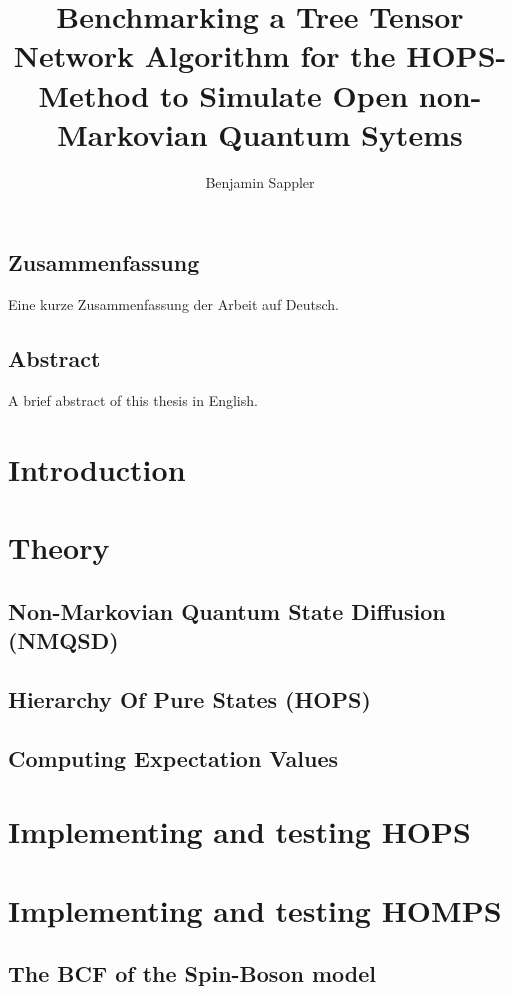 \documentclass[%
thesis=student,%
coverpage=false,%
titlepage=false,%
headmarks=true, %
english,%
font=libertine, %
math=newpxtx, %
BCOR=5mm,%
coverBCOR=11mm%
]{tumbook}
\title{Benchmarking a Tree Tensor Network Algorithm for the HOPS-Method to Simulate Open non-Markovian Quantum Sytems}
\author{Benjamin Sappler}
\begin{document}
\frontmatter
\maketitle

\section*{Zusammenfassung}
Eine kurze Zusammenfassung der Arbeit auf Deutsch.

\section*{Abstract}
A brief abstract of this thesis in English.


\tableofcontents

\mainmatter{}

\chapter{Introduction}

\chapter{Theory}

\section{Non-Markovian Quantum State Diffusion (NMQSD)}

\section{Hierarchy Of Pure States (HOPS)}

\section{Computing Expectation Values}


\chapter{Implementing and testing HOPS}

\chapter{Implementing and testing HOMPS}

\section{The BCF of the Spin-Boson model}


\backmatter{}

\printbibliography{} %
\end{document}

